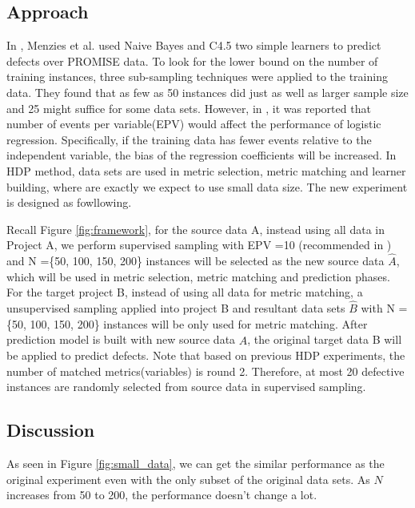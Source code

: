 \subsection{Approach}

In \cite{menzies2008implications}, Menzies et al. used Naive Bayes and C4.5 two simple learners to predict defects over PROMISE data. To look for the lower bound on the number of training instances, three sub-sampling techniques were applied to the training data. They found that as few as 50 instances did just as well as larger sample size and 25 might suffice for some data sets. However, in \cite{peduzzi1996simulation}, it was reported that number of events per variable(EPV) would affect the performance of logistic regression. Specifically, if the training data has fewer events relative to the independent variable, the bias of the regression coefficients will be increased.  In HDP method, data sets are used in metric selection, metric matching and learner building, where are exactly we expect to use small data size. The new experiment is designed as fowllowing.

Recall Figure \ref{fig:framework}, for the source data A, instead using all data in Project A, we perform supervised sampling with EPV =10 (recommended in \cite{peduzzi1996simulation})  and N =\{50, 100, 150, 200\} instances will be selected as the new source data ${\hat A}$, which will be used in metric selection, metric matching and prediction phases. For the target project B, instead of using all data for metric matching, a unsupervised sampling applied into project B and resultant data sets ${\hat B}$ with N = \{50, 100, 150, 200\} instances will be only used for metric matching. After prediction model is built with new source data $\hat A$, the original target data B will be applied to predict defects. Note that based on previous HDP experiments, the number of matched metrics(variables) is round 2. Therefore, at most 20 defective instances are randomly selected from source data in supervised sampling.

\subsection{Discussion}
As seen in Figure \ref{fig:small_data}, we can get the similar performance as the original experiment even with the only subset of the original data sets. As $N$ increases from 50 to 200, the performance doesn't change a lot.



